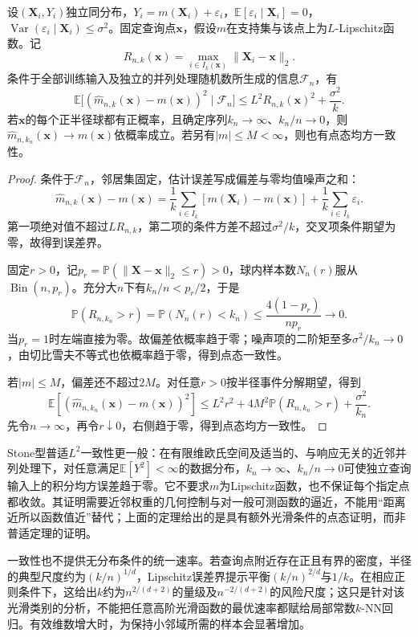 \begin{theorem}[$k$-NN回归的条件误差与点态一致性]
  \label{thm:regression-knn}
  设$(\bm{X}_i,Y_i)$独立同分布，$Y_i=m(\bm{X}_i)+\varepsilon_i$，$\mathbb{E}[\varepsilon_i\mid\bm{X}_i]=0$，$\operatorname{Var}(\varepsilon_i\mid\bm{X}_i)\leq\sigma^2$。固定查询点$\bm{x}$，假设$m$在支持集与该点上为$L$-Lipschitz函数。记
  \[
    R_{n,k}(\bm{x})=\max_{i\in I_k(\bm{x})}
       \lVert\bm{X}_i-\bm{x}\rVert_2.
  \]
  条件于全部训练输入及独立的并列处理随机数所生成的信息$\mathcal F_n$，有
  \[
    \mathbb{E}\bigl[
      (\widehat m_{n,k}(\bm{x})-m(\bm{x}))^2\mid\mathcal F_n\bigr]
    \leq L^2R_{n,k}(\bm{x})^2+\frac{\sigma^2}{k}.
  \]
  若$\bm{x}$的每个正半径球都有正概率，且确定序列$k_n\to\infty$、$k_n/n\to0$，则$\widehat m_{n,k_n}(\bm{x})\to m(\bm{x})$依概率成立。若另有$|m|\leq M<\infty$，则也有点态均方一致性。
\end{theorem}

\begin{proof}
条件于$\mathcal F_n$，邻居集固定，估计误差写成偏差与零均值噪声之和：
\[
  \widehat m_{n,k}(\bm{x})-m(\bm{x})
  =\frac1k\sum_{i\in I_k}[m(\bm{X}_i)-m(\bm{x})]
   +\frac1k\sum_{i\in I_k}\varepsilon_i.
\]
第一项绝对值不超过$LR_{n,k}$，第二项的条件方差不超过$\sigma^2/k$，交叉项条件期望为零，故得到误差界。

固定$r>0$，记$p_r=\mathbb{P}(\lVert\bm{X}-\bm{x}\rVert_2\leq r)>0$，球内样本数$N_n(r)$服从$\operatorname{Bin}(n,p_r)$。充分大$n$下有$k_n/n<p_r/2$，于是
\[
  \mathbb{P}(R_{n,k_n}>r)
  =\mathbb{P}(N_n(r)<k_n)
  \leq\frac{4(1-p_r)}{np_r}\longrightarrow0.
\]
当$p_r=1$时左端直接为零。故偏差依概率趋于零；噪声项的二阶矩至多$\sigma^2/k_n\to0$，由切比雪夫不等式也依概率趋于零，得到点态一致性。

若$|m|\leq M$，偏差还不超过$2M$。对任意$r>0$按半径事件分解期望，得到
\[
  \mathbb{E}[(\widehat m_{n,k_n}(\bm{x})-m(\bm{x}))^2]
  \leq L^2r^2+4M^2\mathbb{P}(R_{n,k_n}>r)+\frac{\sigma^2}{k_n}.
\]
先令$n\to\infty$，再令$r\downarrow0$，右侧趋于零，得到点态均方一致性。
\end{proof}

Stone型普适$L^2$一致性更一般：在有限维欧氏空间及适当的、与响应无关的近邻并列处理下，对任意满足$\mathbb{E}[Y^2]<\infty$的数据分布，$k_n\to\infty$、$k_n/n\to0$可使独立查询输入上的积分均方误差趋于零。它不要求$m$为Lipschitz函数，也不保证每个指定点都收敛。其证明需要近邻权重的几何控制与对一般可测函数的逼近，不能用“距离近所以函数值近”替代；上面的定理给出的是具有额外光滑条件的点态证明，而非普适定理的证明。

一致性也不提供无分布条件的统一速率。若查询点附近存在正且有界的密度，半径的典型尺度约为$(k/n)^{1/d}$，Lipschitz误差界提示平衡$(k/n)^{2/d}$与$1/k$。在相应正则条件下，这给出$k$约为$n^{2/(d+2)}$的量级及$n^{-2/(d+2)}$的风险尺度；这只是针对该光滑类别的分析，不能把任意高阶光滑函数的最优速率都赋给局部常数$k$-NN回归。有效维数增大时，为保持小邻域所需的样本会显著增加。

